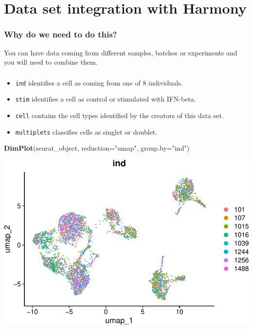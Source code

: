 \documentclass[
]{book}
\newenvironment{Shaded}{\begin{snugshade}}{\end{snugshade}}
\newcommand{\AttributeTok}[1]{\textcolor[rgb]{0.13,0.29,0.53}{#1}}
\newcommand{\FunctionTok}[1]{\textcolor[rgb]{0.13,0.29,0.53}{\textbf{#1}}}
\newcommand{\NormalTok}[1]{#1}
\newcommand{\StringTok}[1]{\textcolor[rgb]{0.31,0.60,0.02}{#1}}
\providecommand{\tightlist}{%
  \setlength{\itemsep}{0pt}\setlength{\parskip}{0pt}}
\begin{document}
\hypertarget{Harmony}{%
\chapter{Data set integration with Harmony}\label{Harmony}}

\hypertarget{why-do-we-need-to-do-this-5}{%
\subsection*{Why do we need to do this?}\label{why-do-we-need-to-do-this-5}}

You can have data coming from different samples, batches or experiments and you will need to combine them.

\hypertarget{section-8}{%
\subsection*{}\label{section-8}}

\begin{itemize}
\tightlist
\item
  \texttt{ind} identifies a cell as coming from one of 8 individuals.
\item
  \texttt{stim} identifies a cell as control or stimulated with IFN-beta.
\item
  \texttt{cell} contains the cell types identified by the creators of this data set.
\item
  \texttt{multiplets} classifies cells as singlet or doublet.
\end{itemize}

\begin{Shaded}
\begin{Highlighting}[]
\FunctionTok{DimPlot}\NormalTok{(seurat\_object, }\AttributeTok{reduction=}\StringTok{"umap"}\NormalTok{, }\AttributeTok{group.by=}\StringTok{"ind"}\NormalTok{)}
\end{Highlighting}
\end{Shaded}

\includegraphics{scRNAseqInR_ABACBS_2024_Doco_files/figure-latex/harmony1-1.pdf}
\end{document}
